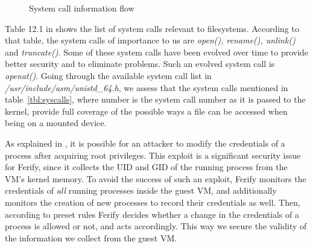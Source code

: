 \begin{figure}[ht]
	\centering
	
	\caption{System call information flow}
	\label{fig:syscall}
\end{figure}

\par Table 12.1 in \cite{linuxkernel} shows the list of system calls relevant to filesystems. According to that table, the system calls of importance to us are \emph{open(), rename(), unlink()} and \emph{truncate()}. Some of these system calls have been evolved over time to provide better security and to eliminate problems. Such an evolved system call is \emph{openat()}. Going through the available system call list in \emph{/usr/include/asm/unistd\_64.h}, we assess that the system calls mentioned in table~\ref{tbl:syscalls}, where number is the system call number as it is passed to the kernel, provide full coverage of the possible ways a file can be accessed when being on a mounted device. 

\par As explained in \cite{perla2010guide}, it is possible for an attacker to modify the credentials of a process after acquiring root privileges. This exploit is a significant security issue for Ferify, since it collects the \ac{UID} and \ac{GID} of the running process from the \ac{VM}'s kernel memory. To avoid the success of such an exploit, Ferify monitors the credentials of \emph{all} running processes inside the guest \ac{VM}, and additionally monitors the creation of new processes to record their credentials as well. Then, according to preset rules Ferify decides whether a change in the credentials of a process is allowed or not, and acts accordingly. This way we secure the validity of the information we collect from the guest \ac{VM}.


